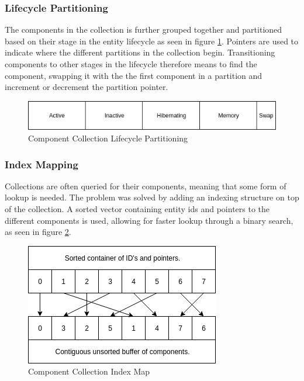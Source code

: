 \subsubsection{Lifecycle Partitioning}
The components in the collection is further grouped together and partitioned based on their stage
in the entity lifecycle as seen in figure \ref{fig:component_collection_partitioning}.
Pointers are used to indicate where the different partitions in the collection begin.
Transitioning components to other stages in the lifecycle therefore means to find the component,
swapping it with the the first component in a partition and increment or decrement the partition pointer.

\begin{figure}[tbp]
    \begin{center}
    \includegraphics[scale=0.45]{images/component_collection_partitioning.png}
    \caption{Component Collection Lifecycle Partitioning}
    \label{fig:component_collection_partitioning}
    \end{center}
\end{figure}

\subsubsection{Index Mapping}
Collections are often queried for their components, meaning that some form of lookup is needed.
The problem was solved by adding an indexing structure on top of the collection.
A sorted vector containing entity ids and pointers to the different components is used,
allowing for faster lookup through a binary search, as seen in figure \ref{fig:component_collection_index_map}.

\begin{figure}[tbp]
    \begin{center}
    \includegraphics[scale=0.45]{images/component_collection_index_map.png}
    \caption{Component Collection Index Map}
    \label{fig:component_collection_index_map}
    \end{center}
\end{figure}

